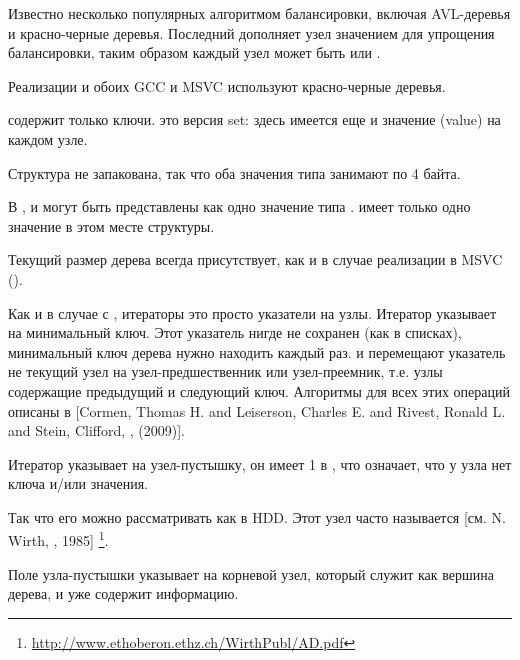 Известно несколько популярных алгоритмом балансировки, включая AVL-деревья и красно-черные деревья.
Последний дополняет узел значением  для упрощения балансировки, таким образом каждый узел может быть
 или .

Реализации  и  обоих GCC и MSVC используют красно-черные деревья.

 содержит только ключи.
 это  версия set: здесь имеется еще и значение (value) на каждом узле.






Структура не запакована, так что оба значения типа \Tchar занимают по 4 байта.

В ,  и  могут быть представлены как одно значение типа .
 имеет только одно значение в этом месте структуры.

Текущий размер дерева всегда присутствует, как и в случае реализации  в MSVC ().

Как и в случае с , итераторы это просто указатели на узлы.
Итератор  указывает на минимальный ключ.
Этот указатель нигде не сохранен (как в списках), минимальный ключ дерева нужно находить каждый раз.
 и  перемещают указатель не текущий узел на узел-предшественник
или узел-преемник, т.е. узлы содержащие предыдущий и следующий ключ.
Алгоритмы для всех этих операций описаны в
[Cormen, Thomas H. and Leiserson, Charles E. and Rivest, Ronald L. and Stein, Clifford,
, (2009)].

Итератор  указывает на узел-пустышку, он имеет 1 в , что означает, что у узла
нет ключа и/или значения.

Так что его можно рассматривать как  в \ac{HDD}.
Этот узел часто называется  [см. N. Wirth, , 1985]
\footnote{\url{http://www.ethoberon.ethz.ch/WirthPubl/AD.pdf}}.

Поле  узла-пустышки указывает на корневой узел, который служит
как вершина дерева, и уже содержит информацию.


